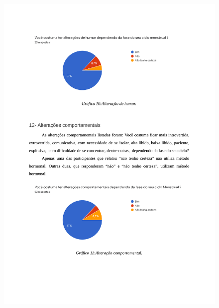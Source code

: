 \begin{apendicesenv}
    \begin{figure}[h]
        \centering
        \includegraphics[keepaspectratio=true,scale=0.7]{figuras/Tab10.pdf}
    \end{figure}
    

\end{apendicesenv}
